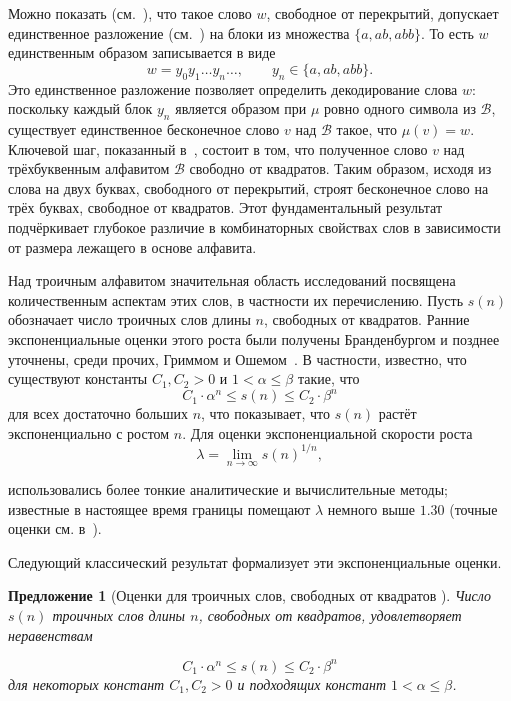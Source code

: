 \documentclass[a4paper,14pt]{extreport}
\theoremstyle{plain}
\newtheorem{proposition}[theorem]{Предложение}
\theoremstyle{definition}
\theoremstyle{remark}
\begin{document}
Можно показать (см.~\cite{Lothaire}), что такое слово $w$, свободное от перекрытий, допускает единственное разложение (см.~\cite{Lothaire}) на блоки из множества $\{a,ab,abb\}$. То есть $w$ единственным образом записывается в виде
\begin{equation}
	w = y_0 y_1 \dots y_n \dots, \qquad y_n \in \{a,ab,abb\}.
\end{equation}
Это единственное разложение позволяет определить декодирование слова $w$: поскольку каждый блок $y_n$ является образом при $\mu$ ровно одного символа из $\mathcal{B}$, существует единственное бесконечное слово $v$ над $\mathcal{B}$ такое, что $\mu(v) = w$. Ключевой шаг, показанный в~\cite{Lothaire}, состоит в том, что полученное слово $v$ над трёхбуквенным алфавитом $\mathcal{B}$ свободно от квадратов.
Таким образом, исходя из слова на двух буквах, свободного от перекрытий, строят бесконечное слово на трёх буквах, свободное от квадратов. 
Этот фундаментальный результат подчёркивает глубокое различие в комбинаторных свойствах слов в зависимости от размера лежащего в основе алфавита. 

Над троичным алфавитом значительная область исследований посвящена количественным аспектам этих слов, в частности их перечислению. Пусть $s(n)$ обозначает число троичных слов длины $n$, свободных от квадратов.
Ранние экспоненциальные оценки этого роста были получены Бранденбургом и позднее уточнены, среди прочих, Гриммом и Ошемом~\cite{Grimm,Ochem}. В частности, известно, что существуют константы $C_1, C_2 > 0$ и $1 < \alpha \leq \beta$ такие, что
\begin{equation}
	C_1 \cdot \alpha^n \leq s(n) \leq C_2 \cdot \beta^n
\end{equation}
для всех достаточно больших $n$, что показывает, что $s(n)$ растёт экспоненциально с ростом $n$. Для оценки экспоненциальной скорости роста
\begin{equation}
	\lambda = \lim_{n \to \infty} s(n)^{1/n},
\end{equation}

использовались более тонкие аналитические и вычислительные методы; известные в настоящее время границы помещают $\lambda$ немного выше $1.30$ (точные оценки см. в~\cite{Richard,Shur}).

Следующий классический результат формализует эти экспоненциальные оценки.
\begin{proposition}[Оценки для троичных слов, свободных от квадратов {\cite{Brinkhuis}}]
	Число $s(n)$ троичных слов длины $n$, свободных от квадратов, удовлетворяет неравенствам
	
	\begin{equation}
		C_1 \cdot \alpha^n \leq s(n) \leq C_2 \cdot \beta^n
	\end{equation}
	для некоторых констант $C_1, C_2 > 0$ и подходящих констант $1 < \alpha \leq \beta$.
\end{proposition}
\end{document}
